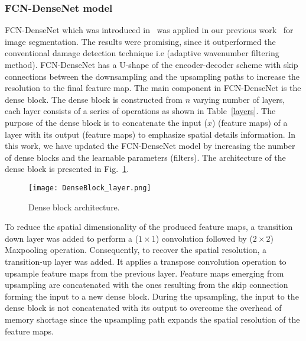\subsubsection{FCN-DenseNet model}
FCN-DenseNet which was introduced in~\cite{Jegou} was applied in our previous work~\cite{Ijjeh2021} for image segmentation.
The results were promising, since it outperformed the conventional damage detection technique i.e (adaptive wavenumber filtering method). 
FCN-DenseNet has a U-shape of the encoder-decoder scheme with skip connections between the downsampling and the upsampling paths to increase the resolution to the final feature map.
The main component in FCN-DenseNet is the dense block.
The dense block is constructed from \(n\) varying number of layers, each layer consists of a series of operations as shown in Table~\ref{layers}.
The purpose of the dense block is to concatenate the input (\(x\)) (feature maps) of a layer  with its output (feature maps) to emphasize spatial details information.
In this work, we have updated the FCN-DenseNet model by increasing the number of dense blocks and the learnable parameters (filters).
The architecture of the dense block is presented in Fig.~\ref{dense_block}. 
\begin{figure} [h!]
	\begin{center}
		\texttt{[image: DenseBlock\_layer.png]}
	\end{center}
	\caption{Dense block architecture.} 
	\label{dense_block}
\end{figure}
To reduce the spatial dimensionality of the produced feature maps, a transition down layer was added to perform a (\(1\times 1\)) convolution followed by (\(2\times2\)) Maxpooling operation. 
Consequently, to recover the spatial resolution, a transition-up layer was added. 
It applies a transpose convolution operation to upsample feature maps from the previous layer.
Feature maps emerging from upsampling are concatenated with the ones resulting from the skip connection forming the input to a new dense block.
During the upsampling, the input to the dense block is not concatenated with its output to overcome the overhead of memory shortage since the upsampling path expands the spatial resolution of the feature maps. 

